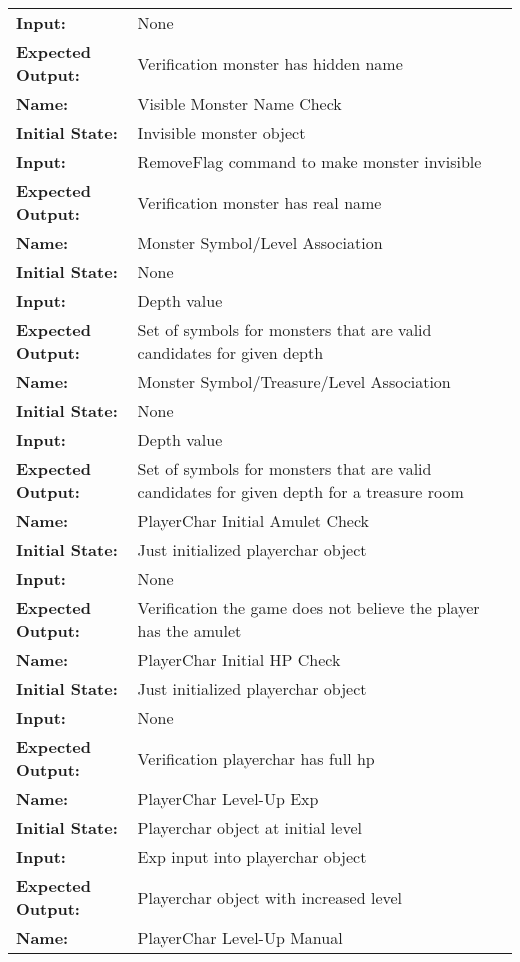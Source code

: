 \documentclass[12pt, titlepage]{article}
\begin{document}
\begin{center}
\begin{longtable}{ l | l }
\textbf{Input:} & None\\
\textbf{Expected Output:} & Verification monster has hidden name\\
\hline
\textbf{Name:} & Visible Monster Name Check\\
\textbf{Initial State:} & Invisible monster object\\
\textbf{Input:} & RemoveFlag command to make monster invisible\\
\textbf{Expected Output:} & Verification monster has real name\\
\hline
\textbf{Name:} & Monster Symbol/Level Association\\
\textbf{Initial State:} & None\\
\textbf{Input:} & Depth value\\
\textbf{Expected Output:} & Set of symbols for monsters that are valid candidates for given depth\\
\hline
\textbf{Name:} & Monster Symbol/Treasure/Level Association\\
\textbf{Initial State:} & None\\
\textbf{Input:} & Depth value\\
\textbf{Expected Output:} & Set of symbols for monsters that are valid candidates for given depth for a treasure room\\
\hline
\textbf{Name:} & PlayerChar Initial Amulet Check\\
\textbf{Initial State:} & Just initialized playerchar object\\
\textbf{Input:} & None\\
\textbf{Expected Output:} & Verification the game does not believe the player has the amulet\\
\hline
\textbf{Name:} & PlayerChar Initial HP Check\\
\textbf{Initial State:} & Just initialized playerchar object\\
\textbf{Input:} & None\\
\textbf{Expected Output:} & Verification playerchar has full hp\\
\hline
\textbf{Name:} & PlayerChar Level-Up Exp\\
\textbf{Initial State:} & Playerchar object at initial level\\
\textbf{Input:} & Exp input into playerchar object\\
\textbf{Expected Output:} & Playerchar object with increased level\\
\hline
\textbf{Name:} & PlayerChar Level-Up Manual\\

\end{longtable}
\end{center}
\end{document}
